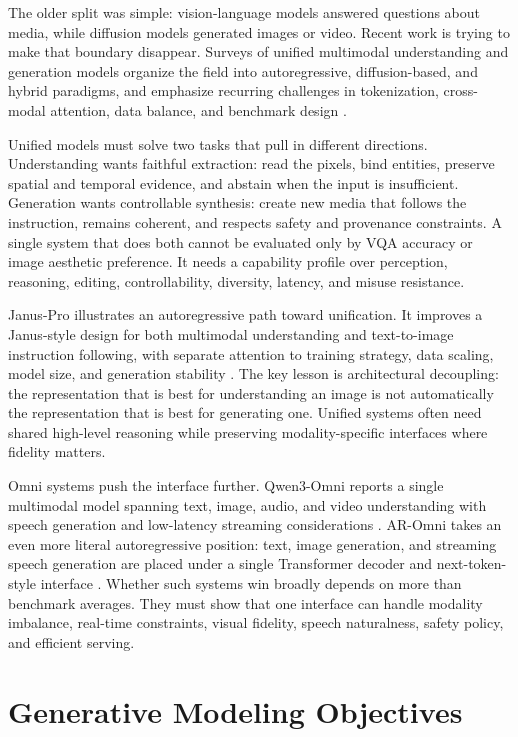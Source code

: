 The older split was simple: vision-language models answered questions about media, while diffusion models generated images or video. Recent work is trying to make that boundary disappear. Surveys of unified multimodal understanding and generation models organize the field into autoregressive, diffusion-based, and hybrid paradigms, and emphasize recurring challenges in tokenization, cross-modal attention, data balance, and benchmark design \cite{zhao2025unifiedmmug}.

Unified models must solve two tasks that pull in different directions. Understanding wants faithful extraction: read the pixels, bind entities, preserve spatial and temporal evidence, and abstain when the input is insufficient. Generation wants controllable synthesis: create new media that follows the instruction, remains coherent, and respects safety and provenance constraints. A single system that does both cannot be evaluated only by VQA accuracy or image aesthetic preference. It needs a capability profile over perception, reasoning, editing, controllability, diversity, latency, and misuse resistance.

Janus-Pro illustrates an autoregressive path toward unification. It improves a Janus-style design for both multimodal understanding and text-to-image instruction following, with separate attention to training strategy, data scaling, model size, and generation stability \cite{chen2025januspro}. The key lesson is architectural decoupling: the representation that is best for understanding an image is not automatically the representation that is best for generating one. Unified systems often need shared high-level reasoning while preserving modality-specific interfaces where fidelity matters.

Omni systems push the interface further. Qwen3-Omni reports a single multimodal model spanning text, image, audio, and video understanding with speech generation and low-latency streaming considerations \cite{qwen2025qwen3omni}. AR-Omni takes an even more literal autoregressive position: text, image generation, and streaming speech generation are placed under a single Transformer decoder and next-token-style interface \cite{cheng2026aromni}. Whether such systems win broadly depends on more than benchmark averages. They must show that one interface can handle modality imbalance, real-time constraints, visual fidelity, speech naturalness, safety policy, and efficient serving.

\section{Generative Modeling Objectives}
\label{sec:generative-modeling-objectives}

